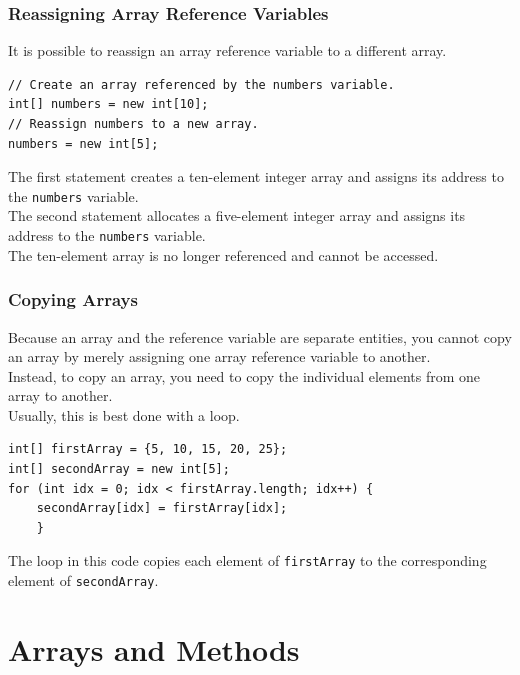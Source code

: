 \documentclass[11pt]{beamer}
\begin{document}
\begin{frame}[fragile]
    \frametitle{Reassigning Array Reference Variables}
    It is possible to reassign an array reference variable to a different array.
    \begin{lstlisting}
// Create an array referenced by the numbers variable.
int[] numbers = new int[10];
// Reassign numbers to a new array.
numbers = new int[5];
    \end{lstlisting}
    The first statement creates a ten-element integer array and assigns its address to the \texttt{numbers} variable. \\ \vspace{1em} 
    The second statement allocates a five-element integer array and assigns its address to the \texttt{numbers} variable. \\ \vspace{1em} 
    The ten-element array is no longer referenced and cannot be accessed.
\end{frame}

\begin{frame}[fragile]
    \frametitle{Copying Arrays}
    Because an array and the reference variable are separate entities, you cannot copy an array by merely assigning one array reference variable to another. \\ \vspace{1em} 
    Instead, to copy an array, you need to copy the individual elements from one array to another. \\ \vspace{1em} 
    Usually, this is best done with a loop.
    \begin{lstlisting}
int[] firstArray = {5, 10, 15, 20, 25};
int[] secondArray = new int[5];
for (int idx = 0; idx < firstArray.length; idx++) {
    secondArray[idx] = firstArray[idx];
    }
    \end{lstlisting}
    The loop in this code copies each element of \texttt{firstArray} to the corresponding element of \texttt{secondArray}.
\end{frame}

\section{Arrays and Methods}
\end{document}
